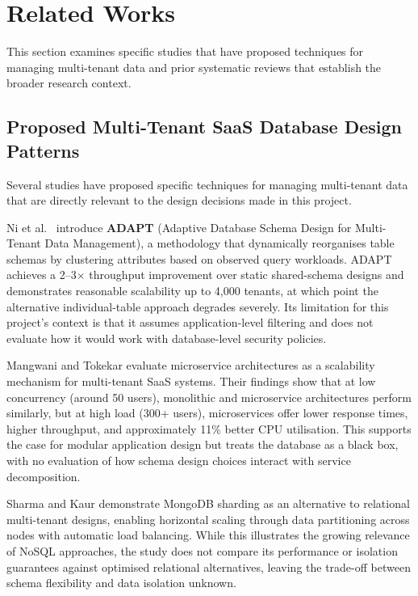 \section{Related Works}
This section examines specific studies that have proposed techniques for managing multi-tenant data and prior systematic reviews that establish the broader research context.

\subsection*{Proposed Multi-Tenant SaaS Database Design Patterns}
Several studies have proposed specific techniques for managing multi-tenant data
that are directly relevant to the design decisions made in this project.

Ni et al.\ \cite{niAdaptiveDatabaseSchema2014} introduce \textbf{ADAPT} (Adaptive Database Schema Design for
Multi-Tenant Data Management), a methodology that dynamically reorganises table
schemas by clustering attributes based on observed query workloads. ADAPT achieves
a 2--3$\times$ throughput improvement over static shared-schema designs and
demonstrates reasonable scalability up to 4,000 tenants, at which point the
alternative individual-table approach degrades severely. Its limitation for this
project's context is that it assumes application-level filtering and does not
evaluate how it would work with database-level security policies.

Mangwani and Tokekar \cite{mangwaniContainerBasedScalability2022} evaluate microservice architectures as a
scalability mechanism for multi-tenant SaaS systems. Their findings show that at
low concurrency (around 50 users), monolithic and microservice architectures
perform similarly, but at high load (300+ users), microservices offer lower
response times, higher throughput, and approximately 11\% better CPU utilisation.
This supports the case for modular application design but treats the database as
a black box, with no evaluation of how schema design choices interact with
service decomposition.

Sharma and Kaur \cite{sharmaImplementingMultitenantSystem2021} demonstrate MongoDB sharding as an alternative
to relational multi-tenant designs, enabling horizontal scaling through data
partitioning across nodes with automatic load balancing. While this illustrates
the growing relevance of NoSQL approaches, the study does not compare its
performance or isolation guarantees against optimised relational alternatives,
leaving the trade-off between schema flexibility and data isolation unknown.

